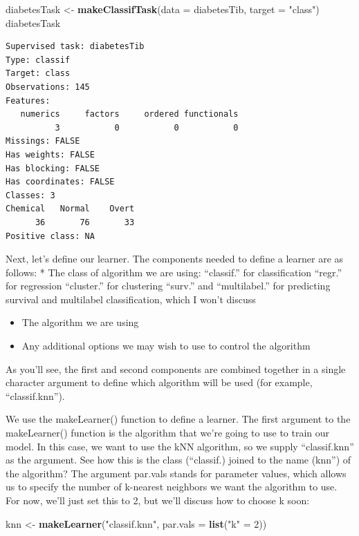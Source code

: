 \documentclass[
]{article}
\newenvironment{Shaded}{\begin{snugshade}}{\end{snugshade}}
\newcommand{\AttributeTok}[1]{\textcolor[rgb]{0.13,0.29,0.53}{#1}}
\newcommand{\DecValTok}[1]{\textcolor[rgb]{0.00,0.00,0.81}{#1}}
\newcommand{\FunctionTok}[1]{\textcolor[rgb]{0.13,0.29,0.53}{\textbf{#1}}}
\newcommand{\NormalTok}[1]{#1}
\newcommand{\OtherTok}[1]{\textcolor[rgb]{0.56,0.35,0.01}{#1}}
\newcommand{\StringTok}[1]{\textcolor[rgb]{0.31,0.60,0.02}{#1}}
\providecommand{\tightlist}{%
  \setlength{\itemsep}{0pt}\setlength{\parskip}{0pt}}
\begin{document}
\begin{Shaded}
\begin{Highlighting}[]
\NormalTok{diabetesTask }\OtherTok{\textless{}{-}} \FunctionTok{makeClassifTask}\NormalTok{(}\AttributeTok{data =}\NormalTok{ diabetesTib, }\AttributeTok{target =} \StringTok{"class"}\NormalTok{)}
\NormalTok{diabetesTask}
\end{Highlighting}
\end{Shaded}

\begin{verbatim}
Supervised task: diabetesTib
Type: classif
Target: class
Observations: 145
Features:
   numerics     factors     ordered functionals 
          3           0           0           0 
Missings: FALSE
Has weights: FALSE
Has blocking: FALSE
Has coordinates: FALSE
Classes: 3
Chemical   Normal    Overt 
      36       76       33 
Positive class: NA
\end{verbatim}

Next, let's define our learner. The components needed to define a
learner are as follows: * The class of algorithm we are using:
``classif.'' for classification ``regr.'' for regression ``cluster.''
for clustering ``surv.'' and ``multilabel.'' for predicting survival and
multilabel classification, which I won't discuss

\begin{itemize}
\tightlist
\item
  The algorithm we are using
\item
  Any additional options we may wish to use to control the algorithm
\end{itemize}

As you'll see, the first and second components are combined together in
a single character argument to define which algorithm will be used (for
example, ``classif.knn'').

We use the makeLearner() function to define a learner. The first
argument to the makeLearner() function is the algorithm that we're going
to use to train our model. In this case, we want to use the kNN
algorithm, so we supply ``classif.knn'' as the argument. See how this is
the class (``classif.) joined to the name (knn'') of the algorithm? The
argument par.vals stands for parameter values, which allows us to
specify the number of k-nearest neighbors we want the algorithm to use.
For now, we'll just set this to 2, but we'll discuss how to choose k
soon:

\begin{Shaded}
\begin{Highlighting}[]
\NormalTok{knn }\OtherTok{\textless{}{-}} \FunctionTok{makeLearner}\NormalTok{(}\StringTok{"classif.knn"}\NormalTok{, }\AttributeTok{par.vals =} \FunctionTok{list}\NormalTok{(}\StringTok{"k"} \OtherTok{=} \DecValTok{2}\NormalTok{))}
\end{Highlighting}
\end{Shaded}
\end{document}
